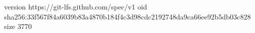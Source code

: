 version https://git-lfs.github.com/spec/v1
oid sha256:33f567f84a6039b83a4870b184f4c3d98cdc2192748da9ca66ee92b5db03c828
size 3770
